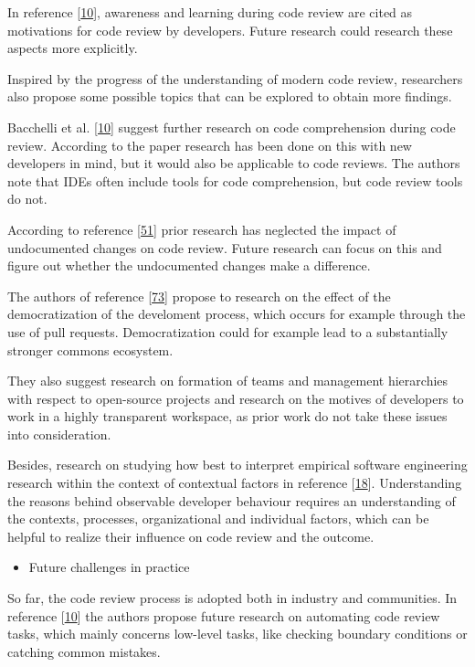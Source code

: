 \documentclass[]{book}
\providecommand{\tightlist}{%
  \setlength{\itemsep}{0pt}\setlength{\parskip}{0pt}}
\begin{document}
In reference
{[}\protect\hyperlink{ref-bacchelli2013expectations}{10}{]}, awareness
and learning during code review are cited as motivations for code review
by developers. Future research could research these aspects more
explicitly.

Inspired by the progress of the understanding of modern code review,
researchers also propose some possible topics that can be explored to
obtain more findings.

Bacchelli et al.
{[}\protect\hyperlink{ref-bacchelli2013expectations}{10}{]} suggest
further research on code comprehension during code review. According to
the paper research has been done on this with new developers in mind,
but it would also be applicable to code reviews. The authors note that
IDEs often include tools for code comprehension, but code review tools
do not.

According to reference
{[}\protect\hyperlink{ref-czerwonka2015code}{51}{]} prior research has
neglected the impact of undocumented changes on code review. Future
research can focus on this and figure out whether the undocumented
changes make a difference.

The authors of reference
{[}\protect\hyperlink{ref-gousios2014exploratory}{73}{]} propose to
research on the effect of the democratization of the develoment process,
which occurs for example through the use of pull requests.
Democratization could for example lead to a substantially stronger
commons ecosystem.

They also suggest research on formation of teams and management
hierarchies with respect to open-source projects and research on the
motives of developers to work in a highly transparent workspace, as
prior work do not take these issues into consideration.

Besides, research on studying how best to interpret empirical software
engineering research within the context of contextual factors in
reference {[}\protect\hyperlink{ref-baysal2013influence}{18}{]}.
Understanding the reasons behind observable developer behaviour requires
an understanding of the contexts, processes, organizational and
individual factors, which can be helpful to realize their influence on
code review and the outcome.

\begin{itemize}
\tightlist
\item
  Future challenges in practice
\end{itemize}

So far, the code review process is adopted both in industry and
communities. In reference
{[}\protect\hyperlink{ref-bacchelli2013expectations}{10}{]} the authors
propose future research on automating code review tasks, which mainly
concerns low-level tasks, like checking boundary conditions or catching
common mistakes.
\end{document}
